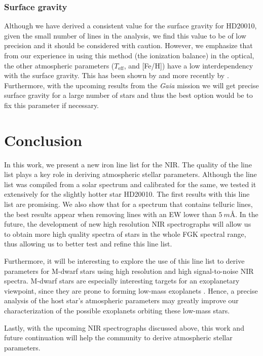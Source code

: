 \documentclass{aa}
\begin{document}
\subsubsection{Surface gravity}
\label{subs:surface_gravity}
Although we have derived a consistent value for the surface gravity for
HD20010, given the small number of  lines in the analysis,
we find this value to be of low precision and it should be considered with caution.
However, we emphasize that from our experience in using this method (the ionization
balance) in the optical, the other atmospheric parameters ($T_\mathrm{eff}$,
and [Fe/H]) have a low interdependency with the surface gravity. This has
been shown by \citet{Torres2012} and more recently by \citet{Mortier2014}.
Furthermore, with the upcoming results from the \emph{Gaia} mission we will
get precise surface gravity for a large number of stars and thus the best
option would be to fix this parameter if necessary.


\section{Conclusion}
\label{sec:conclusion}

In this work, we present a new iron line list for the NIR. The quality
of the line list plays a key role in deriving atmospheric stellar
parameters. Although the line list was compiled from a solar spectrum and
calibrated for the same, we tested it extensively for the slightly
hotter star HD20010. The first results with this line list are
promising. We also show that for a spectrum that contains telluric
lines, the best results appear when removing lines with an EW lower
than $\SI{5}{m\angstrom}$. In the future, the development of new high
resolution NIR spectrographs will allow us to obtain more high quality
spectra of stars in the whole FGK spectral range, thus allowing us to
better test and refine this line list.

Furthermore, it will be interesting to explore the use of this line list
to derive parameters for M-dwarf stars using high resolution and high
signal-to-noise NIR spectra. M-dwarf stars are especially interesting
targets for an exoplanetary viewpoint, since they are prone to forming
low-mass exoplanets \citep{Bonfils2013}. Hence, a precise analysis
of the host star's atmospheric parameters may greatly improve our
characterization of the possible exoplanets orbiting these low-mass
stars.

Lastly, with the upcoming NIR spectrographs  discussed above,
this work and future continuation will help the community to derive
atmospheric stellar parameters.
\end{document}
